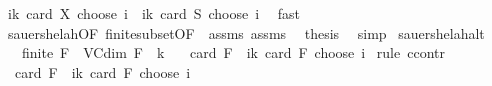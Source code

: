\begin{isabellebody}
\ {\isachardoublequoteopen}{\isacharparenleft}{\kern0pt}{\isasymSum}i{\isasymle}k{\isachardot}{\kern0pt}\ card\ {\isacharparenleft}{\kern0pt}{\isasymUnion}X{\isacharparenright}{\kern0pt}\ choose\ i{\isacharparenright}{\kern0pt}\ {\isasymle}\ {\isacharparenleft}{\kern0pt}{\isasymSum}i{\isasymle}k{\isachardot}{\kern0pt}\ card\ S\ choose\ i{\isacharparenright}{\kern0pt}{\isachardoublequoteclose}\ \isamarkupfalse%
\ fast\isanewline
\ \ \isamarkupfalse%
\ sauer{\isacharunderscore}{\kern0pt}shelah{\isacharbrackleft}{\kern0pt}OF\ finite{\isacharunderscore}{\kern0pt}subset{\isacharbrackleft}{\kern0pt}OF\ {}\ assms{\isacharparenleft}{\kern0pt}{}{\isacharparenright}{\kern0pt}{\isacharbrackright}{\kern0pt}{\isacharbrackright}{\kern0pt}\ assms{\isacharparenleft}{\kern0pt}{}{\isacharparenright}{\kern0pt}\ \isamarkupfalse%
\ {\isacharquery}{\kern0pt}thesis\ \isamarkupfalse%
\ simp\isanewline
{}\isamarkupfalse%
%
\endisatagproof
{\isafoldproof}%
%
\isadelimproof
%
\endisadelimproof
%
\isadelimdocument
%
\endisadelimdocument
%
\isatagdocument
%
\isamarkuptrue%
%
\endisatagdocument
{\isafolddocument}%
%
\isadelimdocument
%
\endisadelimdocument
{}\isamarkupfalse%
\ sauer{\isacharunderscore}{\kern0pt}shelah{\isacharunderscore}{\kern0pt}alt{\isacharcolon}{\kern0pt}\isanewline
\ \ \ {\isachardoublequoteopen}finite\ {\isacharparenleft}{\kern0pt}{\isasymUnion}F{\isacharparenright}{\kern0pt}{\isachardoublequoteclose}\ \ {\isachardoublequoteopen}VC{\isacharunderscore}{\kern0pt}dim\ F\ {\isacharequal}{\kern0pt}\ k{\isachardoublequoteclose}\isanewline
\ \ \ {\isachardoublequoteopen}card\ F\ {\isasymle}\ {\isacharparenleft}{\kern0pt}{\isasymSum}i{\isasymle}k{\isachardot}{\kern0pt}\ card\ {\isacharparenleft}{\kern0pt}{\isasymUnion}F{\isacharparenright}{\kern0pt}\ choose\ i{\isacharparenright}{\kern0pt}{\isachardoublequoteclose}\isanewline
%
\isadelimproof
%
\endisadelimproof
%
\isatagproof
{}\isamarkupfalse%
\ {\isacharparenleft}{\kern0pt}rule\ ccontr{\isacharparenright}{\kern0pt}\isanewline
\ \ \isamarkupfalse%
\ {\isachardoublequoteopen}{\isasymnot}\ card\ F\ {\isasymle}\ {\isacharparenleft}{\kern0pt}{\isasymSum}i{\isasymle}k{\isachardot}{\kern0pt}\ card\ {\isacharparenleft}{\kern0pt}{\isasymUnion}F{\isacharparenright}{\kern0pt}\ choose\ i{\isacharparenright}{\kern0pt}{\isachardoublequoteclose}\ \isamarkupfalse%

\end{isabellebody}
